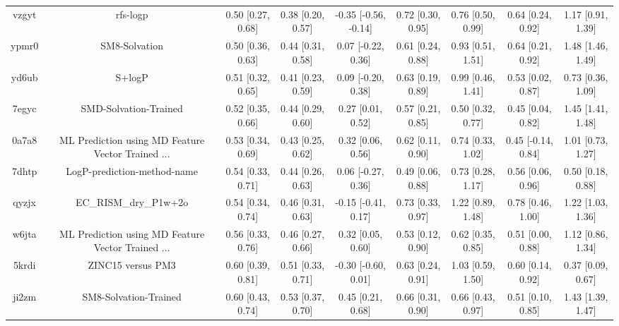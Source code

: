 \documentclass{article}
\begin{document}
\begin{center}
\begin{longtable}{|ccccccccc|}
 vzgyt &                                           rfs-logp &  0.50 [0.27, 0.68] &  0.38 [0.20, 0.57] &  -0.35 [-0.56, -0.14] &  0.72 [0.30, 0.95] &    0.76 [0.50, 0.99] &    0.64 [0.24, 0.92] &     1.17 [0.91, 1.39] \\
 ypmr0 &                                      SM8-Solvation &  0.50 [0.36, 0.63] &  0.44 [0.31, 0.58] &    0.07 [-0.22, 0.36] &  0.61 [0.24, 0.88] &    0.93 [0.51, 1.51] &    0.64 [0.21, 0.92] &     1.48 [1.46, 1.49] \\
 yd6ub &                                             S+logP &  0.51 [0.32, 0.65] &  0.41 [0.23, 0.59] &    0.09 [-0.20, 0.38] &  0.63 [0.19, 0.89] &    0.99 [0.46, 1.41] &    0.53 [0.02, 0.87] &     0.73 [0.36, 1.09] \\
 7egyc &                              SMD-Solvation-Trained &  0.52 [0.35, 0.66] &  0.44 [0.29, 0.60] &     0.27 [0.01, 0.52] &  0.57 [0.21, 0.85] &    0.50 [0.32, 0.77] &    0.45 [0.04, 0.82] &     1.45 [1.41, 1.48] \\
 0a7a8 &  ML Prediction using MD Feature Vector Trained ... &  0.53 [0.34, 0.69] &  0.43 [0.25, 0.62] &     0.32 [0.06, 0.56] &  0.62 [0.11, 0.90] &    0.74 [0.33, 1.02] &   0.45 [-0.14, 0.84] &     1.01 [0.73, 1.27] \\
 7dhtp &                        LogP-prediction-method-name &  0.54 [0.33, 0.71] &  0.44 [0.26, 0.63] &    0.06 [-0.27, 0.36] &  0.49 [0.06, 0.88] &    0.73 [0.28, 1.17] &    0.56 [0.06, 0.96] &     0.50 [0.18, 0.88] \\
 qyzjx &                              EC\_RISM\_dry\_P1w+2o &  0.54 [0.34, 0.74] &  0.46 [0.31, 0.63] &   -0.15 [-0.41, 0.17] &  0.73 [0.33, 0.97] &    1.22 [0.89, 1.48] &    0.78 [0.46, 1.00] &     1.22 [1.03, 1.36] \\
 w6jta &  ML Prediction using MD Feature Vector Trained ... &  0.56 [0.33, 0.76] &  0.46 [0.27, 0.66] &     0.32 [0.05, 0.60] &  0.53 [0.12, 0.90] &    0.62 [0.35, 0.85] &    0.51 [0.00, 0.88] &     1.12 [0.86, 1.34] \\
 5krdi &                                  ZINC15 versus PM3 &  0.60 [0.39, 0.81] &  0.51 [0.33, 0.71] &   -0.30 [-0.60, 0.01] &  0.63 [0.24, 0.91] &    1.03 [0.59, 1.50] &    0.60 [0.14, 0.92] &     0.37 [0.09, 0.67] \\
 ji2zm &                              SM8-Solvation-Trained &  0.60 [0.43, 0.74] &  0.53 [0.37, 0.70] &     0.45 [0.21, 0.68] &  0.66 [0.31, 0.90] &    0.66 [0.43, 0.97] &    0.51 [0.10, 0.85] &     1.43 [1.39, 1.47] \\

\end{longtable}
\end{center}
\end{document}
